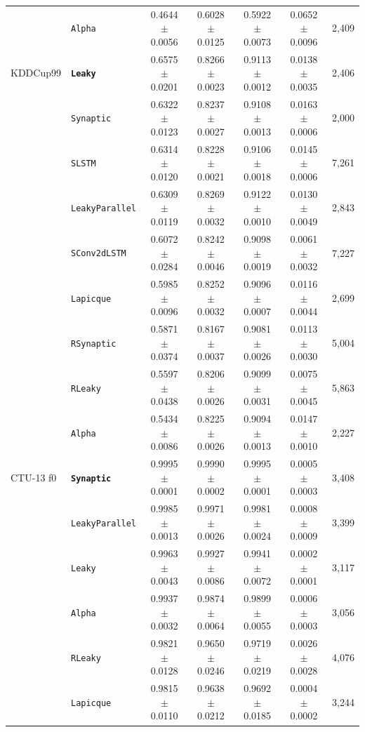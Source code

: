 \begin{table}[t]
{\begin{tabular}{l l c c c c r}
 & \texttt{Alpha} & 0.4644 $\pm$ 0.0056 & 0.6028 $\pm$ 0.0125 & 0.5922 $\pm$ 0.0073 & 0.0652 $\pm$ 0.0096 & 2{,}409 \\
KDDCup99 & \textbf{\texttt{Leaky}} & 0.6575 $\pm$ 0.0201 & 0.8266 $\pm$ 0.0023 & 0.9113 $\pm$ 0.0012 & 0.0138 $\pm$ 0.0035 & 2{,}406 \\
 & \texttt{Synaptic} & 0.6322 $\pm$ 0.0123 & 0.8237 $\pm$ 0.0027 & 0.9108 $\pm$ 0.0013 & 0.0163 $\pm$ 0.0006 & 2{,}000 \\
 & \texttt{SLSTM} & 0.6314 $\pm$ 0.0120 & 0.8228 $\pm$ 0.0021 & 0.9106 $\pm$ 0.0018 & 0.0145 $\pm$ 0.0006 & 7{,}261 \\
 & \texttt{LeakyParallel} & 0.6309 $\pm$ 0.0119 & 0.8269 $\pm$ 0.0032 & 0.9122 $\pm$ 0.0010 & 0.0130 $\pm$ 0.0049 & 2{,}843 \\
 & \texttt{SConv2dLSTM} & 0.6072 $\pm$ 0.0284 & 0.8242 $\pm$ 0.0046 & 0.9098 $\pm$ 0.0019 & 0.0061 $\pm$ 0.0032 & 7{,}227 \\
 & \texttt{Lapicque} & 0.5985 $\pm$ 0.0096 & 0.8252 $\pm$ 0.0032 & 0.9096 $\pm$ 0.0007 & 0.0116 $\pm$ 0.0044 & 2{,}699 \\
 & \texttt{RSynaptic} & 0.5871 $\pm$ 0.0374 & 0.8167 $\pm$ 0.0037 & 0.9081 $\pm$ 0.0026 & 0.0113 $\pm$ 0.0030 & 5{,}004 \\
 & \texttt{RLeaky} & 0.5597 $\pm$ 0.0438 & 0.8206 $\pm$ 0.0026 & 0.9099 $\pm$ 0.0031 & 0.0075 $\pm$ 0.0045 & 5{,}863 \\
 & \texttt{Alpha} & 0.5434 $\pm$ 0.0086 & 0.8225 $\pm$ 0.0026 & 0.9094 $\pm$ 0.0013 & 0.0147 $\pm$ 0.0010 & 2{,}227 \\
CTU-13 f0 & \textbf{\texttt{Synaptic}} & 0.9995 $\pm$ 0.0001 & 0.9990 $\pm$ 0.0002 & 0.9995 $\pm$ 0.0001 & 0.0005 $\pm$ 0.0003 & 3{,}408 \\
 & \texttt{LeakyParallel} & 0.9985 $\pm$ 0.0013 & 0.9971 $\pm$ 0.0026 & 0.9981 $\pm$ 0.0024 & 0.0008 $\pm$ 0.0009 & 3{,}399 \\
 & \texttt{Leaky} & 0.9963 $\pm$ 0.0043 & 0.9927 $\pm$ 0.0086 & 0.9941 $\pm$ 0.0072 & 0.0002 $\pm$ 0.0001 & 3{,}117 \\
 & \texttt{Alpha} & 0.9937 $\pm$ 0.0032 & 0.9874 $\pm$ 0.0064 & 0.9899 $\pm$ 0.0055 & 0.0006 $\pm$ 0.0003 & 3{,}056 \\
 & \texttt{RLeaky} & 0.9821 $\pm$ 0.0128 & 0.9650 $\pm$ 0.0246 & 0.9719 $\pm$ 0.0219 & 0.0026 $\pm$ 0.0028 & 4{,}076 \\
 & \texttt{Lapicque} & 0.9815 $\pm$ 0.0110 & 0.9638 $\pm$ 0.0212 & 0.9692 $\pm$ 0.0185 & 0.0004 $\pm$ 0.0002 & 3{,}244 \\

\end{tabular}}
\end{table}
